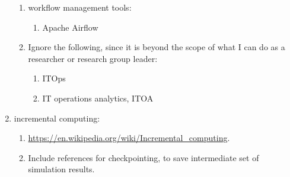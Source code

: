 \documentclass[letter,12pt]{article}
\begin{document}
\begin{enumerate}
\begin{enumerate}
	\item workflow management tools: \vspace{-0.2cm}
		\begin{enumerate} \itemsep -2pt
		\item Apache Airflow
		\end{enumerate}
	\item Ignore the following, since it is beyond the scope of what I can do as a researcher or research group leader: \vspace{-0.2cm}
		\begin{enumerate} \itemsep -2pt
		\item ITOps
		\item IT operations analytics, ITOA
		\end{enumerate}
	\end{enumerate}
\item incremental computing: \vspace{-0.3cm}
	\begin{enumerate} \itemsep -2pt
	\item \url{https://en.wikipedia.org/wiki/Incremental_computing}.
	\item Include references for checkpointing, to save intermediate set of simulation results.
	\end{enumerate}
\end{enumerate}
















%
%
%

{\linespread{1}

%
%

}
%
\end{document}
